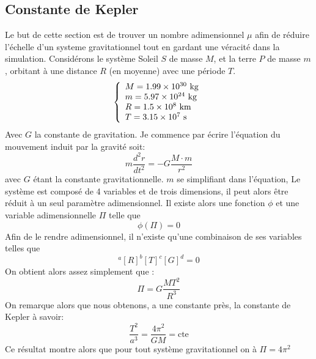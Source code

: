 \subsection*{Constante de Kepler}
Le but de cette section est de trouver un nombre adimensionnel $\mu$ afin de réduire l'échelle d'un systeme gravitationnel tout en gardant une véracité dans la simulation. Considérons le système Soleil $S$ de masse $M$, et la terre $P$ de masse $m$, orbitant à une distance $R$ (en moyenne) avec une période $T$.
\begin{equation}
    \left\{ \begin{array}{l} 
    M = 1.99 \times 10^{30} \text{ kg} \\
    m = 5.97 \times 10^{24} \text{ kg} \\
    R = 1.5 \times 10^{8} \text{ km} \\
    T = 3.15 \times 10^{7} \text{ s} \\
     \end{array} \right.
\end{equation}
Avec $G$ la constante de gravitation.
Je commence par écrire l'équation du mouvement induit par la gravité soit:
\begin{equation}
    m \dfrac{d^2 r}{dt^2} = - G \dfrac{M \cdot m}{r^2}
\end{equation}
avec $G$ étant la constante gravitationnelle. $m$ se simplifiant dans l'équation, Le système est composé de 4 variables et de trois dimensions, il peut alors être réduit à un seul paramètre adimensionnel. Il existe alors une fonction $\phi$ et une variable adimensionnelle $\Pi$ telle  que
\begin{equation}
    \phi ( \Pi ) = 0
\end{equation}
Afin de le rendre adimensionnel, il n'existe qu'une combinaison de ses variables telles que 
\begin{equation}
    [M]^a [R]^b [T]^c [G]^d = 0 
\end{equation}
On obtient alors assez simplement que :
\begin{equation}
\boxed{
    \Pi = G\dfrac{M T^2}{R^3}
    }
\end{equation}
On remarque alors que nous obtenons, a une constante près, la constante de Kepler à savoir:
\begin{equation}
    \dfrac{T^2}{a^3} = \dfrac{4 \pi^2}{GM} = \text{cte}
    \label{Eq:Kepler}
\end{equation}
Ce résultat montre alors que pour tout système gravitationnel on à $\Pi = 4 \pi^2$

